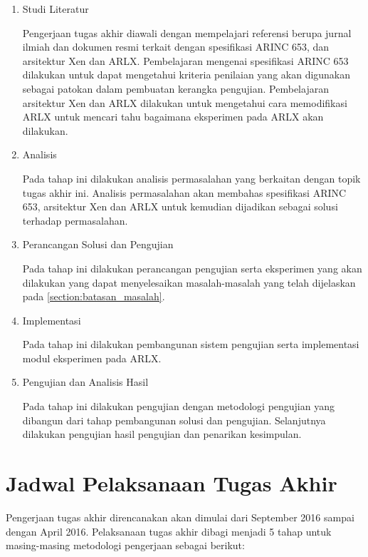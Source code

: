 \begin{enumerate}

    \item Studi Literatur

        Pengerjaan tugas akhir diawali dengan mempelajari referensi berupa jurnal ilmiah dan dokumen resmi terkait dengan spesifikasi ARINC 653, dan arsitektur Xen dan ARLX.
        Pembelajaran mengenai spesifikasi ARINC 653 dilakukan untuk dapat mengetahui kriteria penilaian yang akan digunakan sebagai patokan dalam pembuatan kerangka pengujian.
        Pembelajaran arsitektur Xen dan ARLX dilakukan untuk mengetahui cara memodifikasi ARLX untuk mencari tahu bagaimana eksperimen pada ARLX akan dilakukan.


    \item Analisis

        Pada tahap ini dilakukan analisis permasalahan yang berkaitan dengan topik tugas akhir ini.
        Analisis permasalahan akan membahas spesifikasi ARINC 653, arsitektur Xen dan ARLX untuk kemudian dijadikan sebagai solusi terhadap permasalahan.


    \item Perancangan Solusi dan Pengujian

        Pada tahap ini dilakukan perancangan pengujian serta eksperimen yang akan dilakukan yang dapat menyelesaikan masalah\hyp{}masalah yang telah dijelaskan pada \autoref{section:batasan_masalah}.



    \item Implementasi

        Pada tahap ini dilakukan pembangunan sistem pengujian serta implementasi modul eksperimen pada ARLX.


    \item Pengujian dan Analisis Hasil

        Pada tahap ini dilakukan pengujian dengan metodologi pengujian yang dibangun dari tahap pembangunan solusi dan pengujian.
        Selanjutnya dilakukan pengujian hasil pengujian dan penarikan kesimpulan.


\end{enumerate}

\section{Jadwal Pelaksanaan Tugas Akhir}

Pengerjaan tugas akhir direncanakan akan dimulai dari September 2016 sampai dengan April 2016.
Pelaksanaan tugas akhir dibagi menjadi 5 tahap untuk masing-masing metodologi pengerjaan sebagai berikut:

